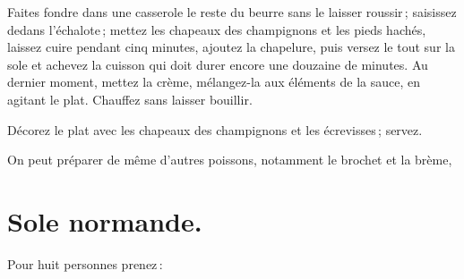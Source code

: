 Faites fondre dans une casserole le reste du beurre sans le laisser roussir ;
saisissez dedans l'échalote ; mettez les chapeaux des champignons et les pieds
hachés, laissez cuire pendant cinq minutes, ajoutez la chapelure, puis versez
le tout sur la sole et achevez la cuisson qui doit durer encore une douzaine de
minutes. Au dernier moment, mettez la crème, mélangez-la aux éléments de la
sauce, en agitant le plat. Chauffez sans laisser bouillir.

Décorez le plat avec les chapeaux des champignons et les écrevisses ; servez.

\sk

On peut préparer de même d'autres poissons, notamment le brochet et la brème,

\section*{\centering Sole normande.}

Pour huit personnes prenez :

\medskip

